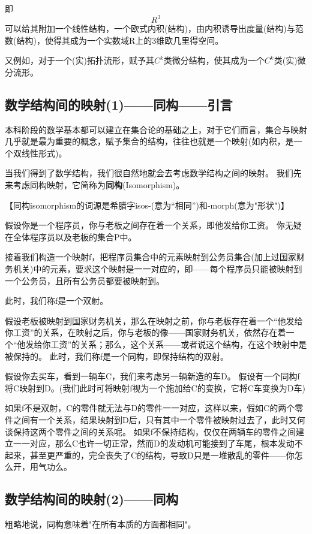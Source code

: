 即\begin{equation}
R^3
\end{equation}
可以给其附加一个线性结构，一个欧式内积(结构)，由内积诱导出度量(结构)与范数(结构)，使得其成为一个实数域R上的3维欧几里得空间。 

又例如，对于一个(实)拓扑流形，赋予其$C^k$类微分结构，使其成为一个$C^k$类(实)微分流形。

\subsection{数学结构间的映射(1)——同构——引言}
本科阶段的数学基本都可以建立在集合论的基础之上，对于它们而言，集合与映射几乎就是最为重要的概念，赋予集合的结构，往往也就是一个映射(如内积，是一个双线性形式)。

当我们得到了数学结构，我们很自然地就会去考虑数学结构之间的映射。
我们先来考虑同构映射，它简称为\textbf{同构}(Isomorphism)。

【同构isomorphism的词源是希腊字isos-(意为“相同”)和-morph(意为"形状")】

假设你是一个程序员，你与老板之间存在着一个关系，即他发给你工资。
你无疑在全体程序员以及老板的集合P中。

接着我们构造一个映射f，把程序员集合中的元素映射到公务员集合(加上过国家财务机关)中的元素，要求这个映射是一一对应的，即——每个程序员只能被映射到一个公务员，且所有公务员都要被映射到。

此时，我们称f是一个双射。

假设老板被映射到国家财务机关，那么在映射之前，你与老板存在着一个“他发给你工资”的关系，在映射之后，你与老板的像——国家财务机关，依然存在着一个“他发给你工资”的关系；那么，这个关系——或者说这个结构，在这个映射中是被保持的。
此时，我们称f是一个同构，即保持结构的双射。

假设你去买车，看到一辆车C，我们来考虑另一辆新造的车D。
假设有一个同构f将C映射到D。(我们此时可将映射f视为一个施加给C的变换，它将C车变换为D车)

如果f不是双射，C的零件就无法与D的零件一一对应，这样以来，假如C的两个零件之间有一个关系，结果映射到D后，只有其中一个零件被映射过去了，此时又何谈保持这两个零件之间的关系呢。
如果f不保持结构，仅仅在两辆车的零件之间建立一一对应，那么C也许一切正常，然而D的发动机可能接到了车尾，根本发动不起来，甚至更严重的，完全丧失了C的结构，导致D只是一堆散乱的零件——你怎么开，用气功么。

\subsection{数学结构间的映射(2)——同构}
粗略地说，同构意味着"在所有本质的方面都相同"。

